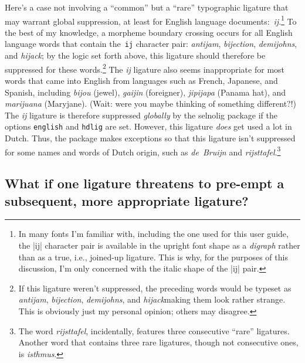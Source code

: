 \documentclass[11pt]{article}
\newcommand{\pkg}[1]{\textsf{#1}}
\newcommand{\opt}[1]{\texttt{#1}}
\begin{document}
Here's a case not involving a \enquote{common} but a \enquote{rare} typographic ligature that may warrant global suppression, at least for English language documents:~\mbox{\emph{ij}}.\footnote{In many fonts I'm familiar with, including the one used for this user guide, the |ij| character pair is available in the upright font shape as a \emph{digraph} rather than as a true, i.e., joined-up ligature. This is why, for the purposes of this discussion, I'm only concerned with the italic shape of the |ij| pair.} To the best of my knowledge, a morpheme boundary crossing occurs for all English language words that contain the~\opt{ij} character pair: \emph{antijam}, \emph{bijection}, \emph{demijohns}, and \emph{hijack}; by the logic set forth above, this ligature should therefore be suppressed for these words.\footnote{If this ligature weren't suppressed, the preceding words would be typeset as \emph{ant\mbox{ij}am}, \emph{b\mbox{ij}ection}, \emph{dem\mbox{ij}ohns}, and \emph{h\mbox{ij}ack}\textemdash making them look rather strange. This is obviously just my personal opinion; others may disagree.} The \mbox{\emph{ij}} ligature also seems inappropriate for most words that came into English from languages such as French, Japanese, and Spanish, including \emph{bijou} (jewel), \emph{gaijin} (foreigner), \emph{jipijapa} (Panama hat), and \emph{marijuana} (Maryjane). (Wait: were you maybe thinking of something different?!) The \mbox{\emph{ij}} ligature is therefore suppressed \emph{globally} by the \pkg{selnolig} package if the options \opt{english} and \opt{hdlig} are set.
However, this ligature \emph{does} get used a lot in Dutch. Thus, the package makes exceptions so that this ligature isn't suppressed for some names and words of Dutch origin, such as \emph{de~Bruijn} and \emph{rijsttafel}.\footnote{The word \emph{rijsttafel}, incidentally, features three consecutive \enquote{rare} ligatures. Another word that contains three rare ligatures, though not consecutive ones, is \emph{\mbox{is}thmus}. }



\subsection{What if one ligature threatens to pre-empt a subsequent, more appropriate ligature?} \label{sec:preempt}
\end{document}
